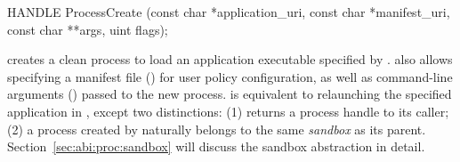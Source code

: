 \begin{paldef}
HANDLE ProcessCreate (const char *application_uri,
                      const char *manifest_uri,
                      const char **args, uint flags);
\end{paldef}


 creates a clean process to load an application executable specified by
. %
 also allows specifying a manifest file () for user policy configuration, as well as command-line arguments () passed to the new process.
 is equivalent to
relaunching the specified application in \graphene{},
except two distinctions: (1)  returns a process handle to its caller;
(2) a process created by  naturally belongs to the same {\em sandbox} as its parent.
Section~\ref{sec:abi:proc:sandbox} will discuss the sandbox abstraction in detail.


















